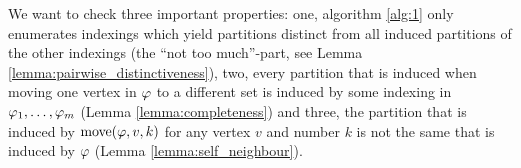 We want to check three important properties: one, algorithm \ref{alg:1} only enumerates indexings which yield partitions distinct from all induced partitions of the other indexings (the ``not too much''-part, see Lemma \ref{lemma:pairwise_distinctiveness}), two, every partition that is induced when moving one vertex in $\varphi$ to a different set is induced by some indexing in $\varphi_1,\dots,\varphi_m$ (Lemma \ref{lemma:completeness}) and three, the partition that is induced by $\mathrm{move}(\varphi,v,k)$ for any vertex $v$ and number $k$ is not the same that is induced by $\varphi$ (Lemma \ref{lemma:self_neighbour}).


